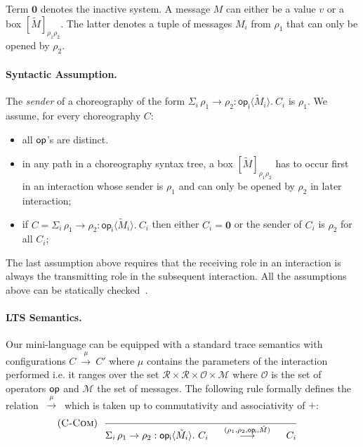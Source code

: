 \documentclass[copyright]{eptcs}
\newcommand{\lts}[1]{\ \stackrel{#1}\longrightarrow\ }
\newcommand{\msgbox}[2]{[#1]_{#2}}
\newcommand{\interact}[4]{#1\rightarrow#2:\mathsf{#3}\langle#4\rangle}
\newcommand{\pfx}{\mathbf.\ }
\newcommand{\INACT}{\mathbf0 }
\newcommand{\Rule}[2]{\displaystyle{\frac{#1}{#2}}}
\newcommand{\Did}[1]{(\textsc{#1})}
\newcommand{\op}[1]{{\sf #1}}
\begin{document}
Term $\INACT$ denotes the inactive system. A message $M$ can either be
a value $v$ or a box $\msgbox{\tilde M}{\rho_1\rho_2}$. The latter
denotes a tuple of messages $M_i$ from $\rho_1$ that can only be
opened by $\rho_2$.

\paragraph{Syntactic Assumption.}  The \emph{sender} of a choreography
of the form $\Sigma_i\,\interact{\rho_1}{\rho_2}{op_i}{\tilde M_i}\pfx
C_i$ is $\rho_1$.  We assume, for every choreography $C$:
\begin{itemize}

  \item all $\op{op}$'s are distinct.

  \item in any path in a choreography syntax tree, a box
  $\msgbox{\tilde M}{\rho_1\rho_2}$ has to occur first in an
  interaction whose sender is $\rho_1$ and can only be opened by
  $\rho_2$ in later interaction;

  \item if $C=\Sigma_i\,\interact{\rho_1}{\rho_2}{op_i}{\tilde
    M_i}\pfx C_i$ then either $C_i=\INACT$ or the sender of $C_i$ is
  $\rho_2$ for all $C_i$;

\end{itemize}
The last assumption above requires that the receiving role in an
interaction is always the transmitting role in the subsequent
interaction. All the assumptions above can be statically
checked~\cite{CG09b}.




\paragraph{LTS Semantics.} Our mini-language can be equipped with a
standard trace semantics with configurations $C\lts{\mu} C'$ where
$\mu$ contains the parameters of the interaction performed i.e. it
ranges over the set $\mathcal R\times\mathcal R\times\mathcal
{O}\times \mathcal M$ where $\mathcal O$ is the set of operators
$\op{op}$ and $\mathcal M$ the set of messages.  The following rule
formally defines the relation $\lts{\mu}$ which is taken up to
commutativity and associativity of $+$:
\begin{align*}
  \Did{C-Com}\
  &\
  \Rule
  {}
  {
    \Sigma_i\,\interact{\rho_1}{\rho_2}{op_i}{\tilde M_i}\pfx C_i
    \quad\lts{(\rho_1,\rho_2,\op{op_i},\tilde M)}\quad
    C_i
  }
\end{align*}
\end{document}
